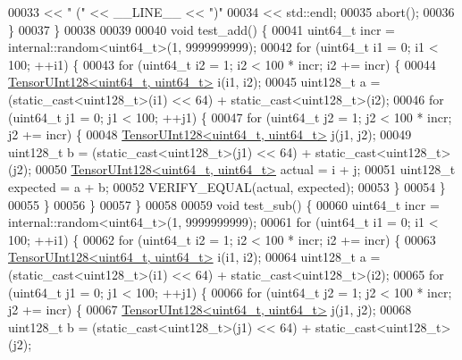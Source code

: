 \begin{DoxyCode}
00033               << \textcolor{stringliteral}{" ("} << \_\_LINE\_\_ << \textcolor{stringliteral}{")"}
00034               << std::endl;
00035     abort();
00036   \}
00037 \}
00038 
00039 
00040 \textcolor{keywordtype}{void} test\_add() \{
00041   uint64\_t incr = internal::random<uint64\_t>(1, 9999999999);
00042   \textcolor{keywordflow}{for} (uint64\_t i1 = 0; i1 < 100; ++i1) \{
00043     \textcolor{keywordflow}{for} (uint64\_t i2 = 1; i2 < 100 * incr; i2 += incr) \{
00044       \hyperlink{struct_eigen_1_1internal_1_1_tensor_u_int128}{TensorUInt128<uint64\_t, uint64\_t>} i(i1, i2);
00045       uint128\_t a = (\textcolor{keyword}{static\_cast<}uint128\_t\textcolor{keyword}{>}(i1) << 64) + \textcolor{keyword}{static\_cast<}uint128\_t\textcolor{keyword}{>}(i2);
00046       \textcolor{keywordflow}{for} (uint64\_t j1 = 0; j1 < 100; ++j1) \{
00047         \textcolor{keywordflow}{for} (uint64\_t j2 = 1; j2 < 100 * incr; j2 += incr) \{
00048           \hyperlink{struct_eigen_1_1internal_1_1_tensor_u_int128}{TensorUInt128<uint64\_t, uint64\_t>} j(j1, j2);
00049           uint128\_t b = (\textcolor{keyword}{static\_cast<}uint128\_t\textcolor{keyword}{>}(j1) << 64) + \textcolor{keyword}{static\_cast<}uint128\_t\textcolor{keyword}{>}(j2);
00050           \hyperlink{struct_eigen_1_1internal_1_1_tensor_u_int128}{TensorUInt128<uint64\_t, uint64\_t>} actual = i + j;
00051           uint128\_t expected = a + b;
00052           VERIFY\_EQUAL(actual, expected);
00053         \}
00054       \}
00055     \}
00056   \}
00057 \}
00058 
00059 \textcolor{keywordtype}{void} test\_sub() \{
00060   uint64\_t incr = internal::random<uint64\_t>(1, 9999999999);
00061   \textcolor{keywordflow}{for} (uint64\_t i1 = 0; i1 < 100; ++i1) \{
00062     \textcolor{keywordflow}{for} (uint64\_t i2 = 1; i2 < 100 * incr; i2 += incr) \{
00063       \hyperlink{struct_eigen_1_1internal_1_1_tensor_u_int128}{TensorUInt128<uint64\_t, uint64\_t>} i(i1, i2);
00064       uint128\_t a = (\textcolor{keyword}{static\_cast<}uint128\_t\textcolor{keyword}{>}(i1) << 64) + \textcolor{keyword}{static\_cast<}uint128\_t\textcolor{keyword}{>}(i2);
00065       \textcolor{keywordflow}{for} (uint64\_t j1 = 0; j1 < 100; ++j1) \{
00066         \textcolor{keywordflow}{for} (uint64\_t j2 = 1; j2 < 100 * incr; j2 += incr) \{
00067           \hyperlink{struct_eigen_1_1internal_1_1_tensor_u_int128}{TensorUInt128<uint64\_t, uint64\_t>} j(j1, j2);
00068           uint128\_t b = (\textcolor{keyword}{static\_cast<}uint128\_t\textcolor{keyword}{>}(j1) << 64) + \textcolor{keyword}{static\_cast<}uint128\_t\textcolor{keyword}{>}(j2);

\end{DoxyCode}
